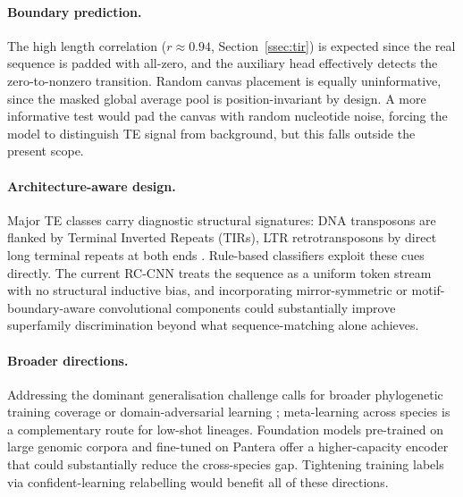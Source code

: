 \documentclass[12pt]{article}
\begin{document}
\paragraph{Boundary prediction.} The high length correlation ($r \approx 0.94$, Section~\ref{ssec:tir}) is expected since the real sequence is padded with all-zero, and the auxiliary head effectively detects the zero-to-nonzero transition. Random canvas placement is equally uninformative, since the masked global average pool is position-invariant by design. A more informative test would pad the canvas with random nucleotide noise, forcing the model to distinguish TE signal from background, but this falls outside the present scope. 

\paragraph{Architecture-aware design.} Major TE classes carry diagnostic structural signatures: DNA transposons are flanked by Terminal Inverted Repeats (TIRs), LTR retrotransposons by direct long terminal repeats at both ends \cite{wells2020field}. Rule-based classifiers exploit these cues directly. The current RC-CNN treats the sequence as a uniform token stream with no structural inductive bias, and incorporating mirror-symmetric or motif-boundary-aware convolutional components could substantially improve superfamily discrimination beyond what sequence-matching alone achieves.

\paragraph{Broader directions.} Addressing the dominant generalisation challenge calls for broader phylogenetic training coverage or domain-adversarial learning \cite{ganin2015unsupervised}; meta-learning across species \cite{finn2017model} is a complementary route for low-shot lineages. Foundation models pre-trained on large genomic corpora and fine-tuned on Pantera \cite{dallatorre2023nucleotide} offer a higher-capacity encoder that could substantially reduce the cross-species gap. Tightening training labels via confident-learning relabelling \cite{northcutt2021confident} would benefit all of these directions.

\newpage
\end{document}
